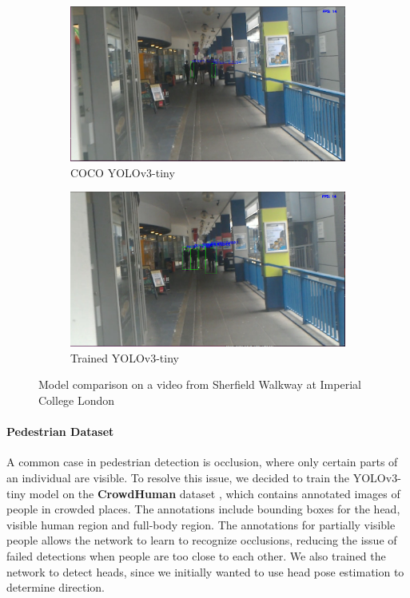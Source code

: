 \begin{figure}[ht]
	\begin{subfigure}[b]{.5\textwidth}
		\centering
		\includegraphics[width=0.95\linewidth]{img/chapter4_analysis/yoloCoco.png}
		\caption{COCO YOLOv3-tiny}
	\end{subfigure}%
	\hspace{\fill} 
	\begin{subfigure}[b]{.5\textwidth}
		\centering
		\includegraphics[width=0.95\linewidth]{img/chapter4_analysis/yoloCH.png}
		\caption{Trained YOLOv3-tiny}
	\end{subfigure}
	\vspace{-2\baselineskip}
	\begin{center}
		\caption{Model comparison on a video from Sherfield Walkway at Imperial College London}
		\label{fig:yoloCHvsCoco}
	\end{center}
	\vspace{-2\baselineskip}
\end{figure}

\paragraph{Pedestrian Dataset} A common case in pedestrian detection is occlusion, where only certain parts of an individual are visible.  To resolve this issue, we decided to train the YOLOv3-tiny model on the \textbf{CrowdHuman} dataset \cite{Shao}, which contains annotated images of people in crowded places. The annotations include bounding boxes for the head, visible human region and full-body region. The annotations for partially visible people allows the network to learn to recognize occlusions, reducing the issue of failed detections when people are too close to each other. We also trained the network to detect heads, since we initially wanted to use head pose estimation to determine direction.

